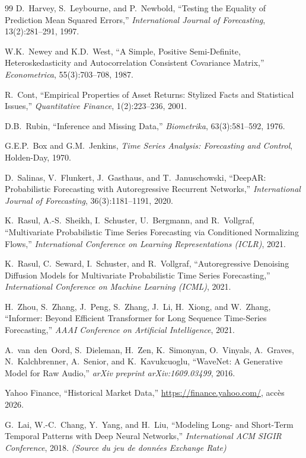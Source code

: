 \documentclass[12pt,a4paper]{article}
\begin{document}
\begin{thebibliography}{99}
D.~Harvey, S.~Leybourne, and P.~Newbold,
``Testing the Equality of Prediction Mean Squared Errors,''
\textit{International Journal of Forecasting}, 13(2):281--291, 1997.

W.K.~Newey and K.D.~West,
``A Simple, Positive Semi-Definite, Heteroskedasticity and Autocorrelation Consistent Covariance Matrix,''
\textit{Econometrica}, 55(3):703--708, 1987.

R.~Cont,
``Empirical Properties of Asset Returns: Stylized Facts and Statistical Issues,''
\textit{Quantitative Finance}, 1(2):223--236, 2001.

D.B.~Rubin,
``Inference and Missing Data,''
\textit{Biometrika}, 63(3):581--592, 1976.

G.E.P.~Box and G.M.~Jenkins,
\textit{Time Series Analysis: Forecasting and Control},
Holden-Day, 1970.

D.~Salinas, V.~Flunkert, J.~Gasthaus, and T.~Januschowski,
``DeepAR: Probabilistic Forecasting with Autoregressive Recurrent Networks,''
\textit{International Journal of Forecasting}, 36(3):1181--1191, 2020.

K.~Rasul, A.-S.~Sheikh, I.~Schuster, U.~Bergmann, and R.~Vollgraf,
``Multivariate Probabilistic Time Series Forecasting via Conditioned Normalizing Flows,''
\textit{International Conference on Learning Representations (ICLR)}, 2021.

K.~Rasul, C.~Seward, I.~Schuster, and R.~Vollgraf,
``Autoregressive Denoising Diffusion Models for Multivariate Probabilistic Time Series Forecasting,''
\textit{International Conference on Machine Learning (ICML)}, 2021.

H.~Zhou, S.~Zhang, J.~Peng, S.~Zhang, J.~Li, H.~Xiong, and W.~Zhang,
``Informer: Beyond Efficient Transformer for Long Sequence Time-Series Forecasting,''
\textit{AAAI Conference on Artificial Intelligence}, 2021.

A.~van~den~Oord, S.~Dieleman, H.~Zen, K.~Simonyan, O.~Vinyals, A.~Graves, N.~Kalchbrenner, A.~Senior, and K.~Kavukcuoglu,
``WaveNet: A Generative Model for Raw Audio,''
\textit{arXiv preprint arXiv:1609.03499}, 2016.

Yahoo Finance,
``Historical Market Data,''
\url{https://finance.yahoo.com/}, acc\`es 2026.

G.~Lai, W.-C.~Chang, Y.~Yang, and H.~Liu,
``Modeling Long- and Short-Term Temporal Patterns with Deep Neural Networks,''
\textit{International ACM SIGIR Conference}, 2018.
\textit{(Source du jeu de donn\'ees Exchange Rate)}

\end{thebibliography}
\end{document}
